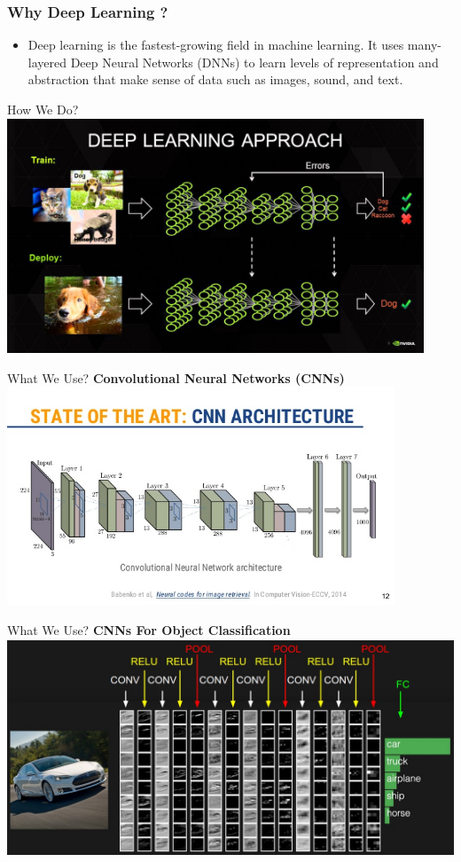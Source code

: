 \documentclass{beamer}
\begin{document}
\begin{frame}
\frametitle{Why Deep Learning ?}
\begin{itemize}
 \item<1->Deep learning is the fastest-growing field in machine learning. It uses many-layered Deep Neural Networks (DNNs) to learn levels of 
representation and abstraction that make sense of data such as images, sound, and text.
\end{itemize}
 
\end{frame}

 \begin{frame}{How We Do?}
     \includegraphics[height=7cm,width=\textwidth]{deep.jpg}
\end{frame}
 \begin{frame}{What We Use?}
 \textbf{Convolutional Neural Networks (CNNs)}
     \includegraphics[height=6.5cm,width=\textwidth]{cnn.jpg}
\end{frame}

 \begin{frame}{What We Use?}
 \textbf{CNNs For Object Classification}
     \includegraphics[height=6.5cm,width=\textwidth]{simpleconv.jpeg}
\end{frame}
\end{document}
